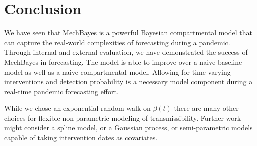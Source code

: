 \documentclass[11pt]{amsart}
\begin{document}
\section{Conclusion}

We have seen that MechBayes is a powerful Bayesian compartmental model that can capture the real-world complexities of forecasting during a pandemic. Through internal and external evaluation, we have demonstrated the success of MechBayes in forecasting. The model is able to improve over a naive baseline model as well as a naive compartmental model. Allowing for time-varying interventions and detection probability is a necessary model component during a real-time pandemic forecasting effort. 

While we chose an exponential random walk on $\beta(t)$ there are many other choices for flexible non-parametric modeling of transmissibility. Further work might consider a spline model, or a Gaussian process, or semi-parametric models capable of taking intervention dates as covariates. 




\end{document}
